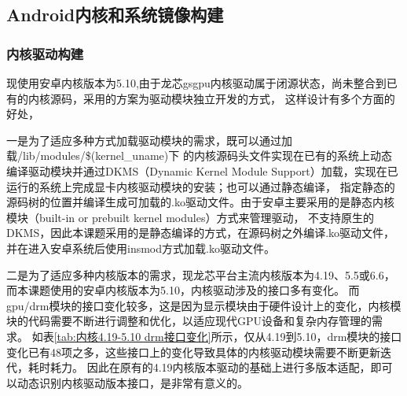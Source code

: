 








\subsection{Android内核和系统镜像构建}

\subsubsection{内核驱动构建}
现使用安卓内核版本为5.10,由于龙芯gsgpu内核驱动属于闭源状态，尚未整合到已有的内核源码，采用的方案为驱动模块独立开发的方式，
这样设计有多个方面的好处，

一是为了适应多种方式加载驱动模块的需求，既可以通过加载/lib/modules/\$(kernel\_uname)下
的内核源码头文件实现在已有的系统上动态编译驱动模块并通过DKMS（Dynamic Kernel Module Support）加载，实现在已运行的系统上完成显卡内核驱动模块的安装；也可以通过静态编译，
指定静态的源码树的位置并编译生成可加载的.ko驱动文件。由于安卓主要采用的是静态内核模块（built-in or prebuilt kernel modules）方式来管理驱动，
不支持原生的DKMS，因此本课题采用的是静态编译的方式，在源码树之外编译.ko驱动文件，并在进入安卓系统后使用insmod方式加载.ko驱动文件。

二是为了适应多种内核版本的需求，现龙芯平台主流内核版本为4.19、5.5或6.6，而本课题使用的安卓内核版本为5.10，内核驱动涉及的接口多有变化。
而gpu/drm模块的接口变化较多，这是因为显示模块由于硬件设计上的变化，内核模块的代码需要不断进行调整和优化，以适应现代GPU设备和复杂内存管理的需求。
如表\ref{tab:内核4.19-5.10 drm接口变化}所示，仅从4.19到5.10，drm模块的接口变化已有48项之多，这些接口上的变化导致具体的内核驱动模块需要不断更新迭代，耗时耗力。
因此在原有的4.19内核版本驱动的基础上进行多版本适配，即可以动态识别内核驱动版本接口，是非常有意义的。

